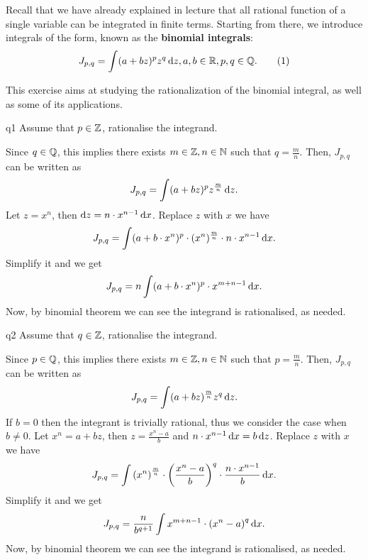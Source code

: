 \documentclass[reqno]{alittlebear}
\begin{document}

\begin{exercise}{}{}
    \begin{note}
        \quad Recall that we have already explained in lecture that all rational function of a single variable can be integrated in finite terms. Starting from there, we introduce integrals of the form, known as the \textbf{binomial integrals}:
        \[\begin{aligned}J_{p,q}=\int(a+bz)^pz^q\D z,a,b\in\mathbb{R},p,q\in\mathbb{Q}. \end{aligned} \numberthis \label{eq1}\]
    
    
        This exercise aims at studying the rationalization of the binomial integral, as well as some of its applications.
    \end{note}
\begin{question}{}{q1}
    Assume that $p\in\mathbb{Z}$, rationalise the integrand.
    \qbreak
    \begin{mathnote}
        Since $q\in\mathbb{Q}$, this implies there exists $m\in\mathbb{Z}, n\in\mathbb{N}$ such that $q=\frac{m}{n}$. Then, $J_{p,q}$ can be written as \[\begin{aligned}J_{p,q}=\int(a+bz)^pz^{\frac{m}{n}}\mathop{}\!\mathrm{d} z.\end{aligned}\] Let $z=x^n$, then $\mathop{}\!\mathrm{d} z=n\cdot x^{n-1}\mathop{}\!\mathrm{d} x$. Replace $z$ with $x$ we have \[\begin{aligned}J_{p,q}=\int(a+b\cdot x^n)^p \cdot (x^n)^{\frac{m}{n}}\cdot n\cdot x^{n-1}\mathop{}\!\mathrm{d} x.\end{aligned}\] Simplify it and we get \[\begin{aligned}J_{p,q}=n\int(a+b\cdot x^n)^p \cdot x^{m+n-1}\mathop{}\!\mathrm{d} x.\end{aligned}\] Now, by binomial theorem we can see the integrand is rationalised, as needed.
    \end{mathnote}
\end{question}
\newpage
\begin{question}{}{q2}
    Assume that $q\in\mathbb{Z}$, rationalise the integrand.
    \qbreak
    \begin{mathnote}
        Since $p\in\mathbb{Q}$, this implies there exists $m\in\mathbb{Z}, n\in\mathbb{N}$ such that $p=\frac{m}{n}$. Then, $J_{p,q}$ can be written as \[\begin{aligned}J_{p,q}=\int(a+bz)^{\frac{m}{n}}z^q\mathop{}\!\mathrm{d} z.\end{aligned}\] If $b=0$ then the integrant is trivially rational, thus we consider the case when $b\neq0$. Let $x^n=a+bz$, then $z=\frac{x^n-a}{b}$ and $n\cdot x^{n-1}\mathop{}\!\mathrm{d} x=b\mathop{}\!\mathrm{d} z$. Replace $z$ with $x$ we have \[\begin{aligned}J_{p,q}=\int \left(x^n\right)^{\frac{m}{n}}\cdot\left(\frac{x^n-a}{b}\right)^q\cdot\frac{n\cdot x^{n-1}}{b}\mathop{}\!\mathrm{d} x.\end{aligned}\] Simplify it and we get \[\begin{aligned}J_{p,q}=\frac{n}{b^{q+1}}\int x^{m+n-1}\cdot\left(x^n-a\right)^q\mathop{}\!\mathrm{d} x.\end{aligned}\] Now, by binomial theorem we can see the integrand is rationalised, as needed.

\end{mathnote}
\end{question}
\end{exercise}
\end{document}
